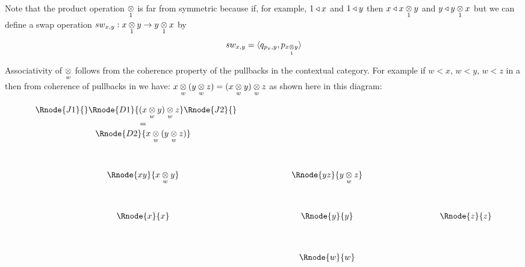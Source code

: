 \note 
Note that the product operation $\crossx{}{}{1}$ is far from symmetric 
because if, for example, $1 \base x$ and $1 \base y$ then $x \base \crossx{x}{y}{1}$ and $y \base \crossx{y}{x}{1}$ but we can define 
a swap operation $sw_{x,y} : \crossx{x}{y}{1} \morph \crossx{y}{x}{1}$ by
\begin{equation}
sw_{x,y} = \tuple{q_{p_x,y}, p_{\crossx{x}{y}{1}}}
\end{equation}

\note
Associativity of $\crossx{}{}w$  follows from the coherence property of the pullbacks in the contextual category. 
For example if $w < x$, $w < y$, $w < z$ in a \ccat then from coherence of pullbacks in \ccat we have:
$\crossx{x}{(\crossx{y}{z}{w})}{w} = \crossx{(\crossx{x}{y}{w})}{z}{w}$ as shown here in this diagram:
 
\begin{displaymath}
\begin{array}{cp{1.0cm}cp{1.0cm}c}
\Rnode{J1}{}\Rnode{D1} {\crossx{(\crossx{x}{y}{w})}{z}{w}}\Rnode{J2}{} \ \ \ \ \   &&  &&  \\ 
= && && \\
\Rnode{D2} {\crossx{x}{(\crossx{y}{z}{w})}{w}}    &&  &&                        \\ [1.3cm]
\Rnode{xy}{\crossx{x}{y}{w}}&& \Rnode{yz}{\crossx{y}{z}{w}} &&                      \\[1.3cm]
\Rnode{x}{x}&& \Rnode{y}{y} && \ \ \ \ \ \ \ \ \ \ \ \ \ \Rnode{z}{z}                                        \\[1.3cm]
             && \Rnode{w}{w} &&                                                     
\end{array}
\end{displaymath}









